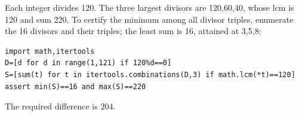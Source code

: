 Each integer divides 120. The three largest divisors are 120,60,40, whose lcm is 120 and sum 220. To certify the minimum among all divisor triples, enumerate the 16 divisors and their triples; the least sum is 16, attained at 3,5,8:
\begin{verbatim}
import math,itertools
D=[d for d in range(1,121) if 120%d==0]
S=[sum(t) for t in itertools.combinations(D,3) if math.lcm(*t)==120]
assert min(S)==16 and max(S)==220
\end{verbatim}
The required difference is $\boxed{204}$.
